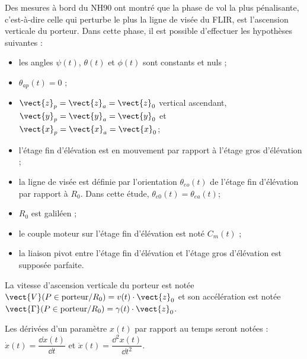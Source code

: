 Des mesures à bord du NH90 ont montré que la phase de vol la plus pénalisante, c'est-à-dire celle qui perturbe
le plus la ligne de visée du FLIR, est l'ascension verticale du porteur. Dans cette phase, il est possible d'effectuer
les hypothèses suivantes :
\begin{itemize}
\item les angles $\psi(t)$, $\theta(t)$ et $\phi(t)$ sont constants et nuls ;
\item $\theta_{ap}(t)=0$ ;
\item $\vect{z}_p=\vect{z}_a=\vect{z}_0$ vertical ascendant, $\vect{y}_p=\vect{y}_a=\vect{y}_0$ et $\vect{x}_p=\vect{x}_a=\vect{x}_0$;
\item l'étage fin d'élévation est en mouvement par rapport à l'étage gros d'élévation ;
\item la ligne de visée est définie par l'orientation $\theta_{eo}(t)$ de l'étage fin d'élévation par rapport à $R_0$. Dans cette
étude, $\theta_{e0}(t)=\theta_{ea}(t)$;
\item $R_0$ est galiléen ;
\item le couple moteur sur l'étage fin d'élévation est noté $C_m(t)$ ;
\item la liaison pivot entre l'étage fin d'élévation et l'étage gros d'élévation est supposée parfaite.
\end{itemize}

La vitesse d'ascension verticale du porteur est notée $\vect{V}(P\in \text{porteur}/R_0)=v(t)\cdot \vect{z}_0$ et son accélération est notée $\vect{\Gamma}(P\in \text{porteur}/R_0)=\gamma(t)\cdot \vect{z}_0$.

Les dérivées d'un paramètre $x(t)$ par rapport au temps seront notées : $\dot{x}(t)=\dfrac{\dd x(t)}{\dd t}$ et $\ddot{x}(t)=\dfrac{\dd ^2x(t)}{\dd t^2}$. 

